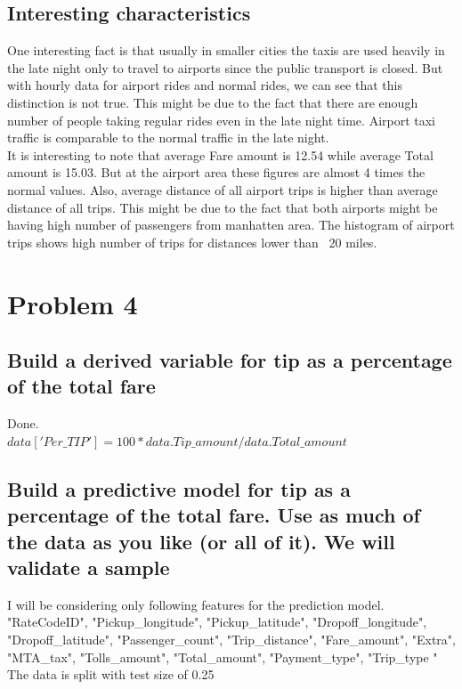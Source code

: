 \documentclass[letterpaper, 11pt]{article}
\begin{document}
\subsection*{Interesting characteristics}
One interesting fact is that usually in smaller cities the taxis are used heavily in the late night only to travel to airports since the public transport is closed. But with hourly data for airport rides and normal rides, we can see that this distinction is not true. This might be due to the fact that there are enough number of people taking regular rides even in the late night time. Airport taxi traffic is comparable to the normal traffic in the late night.\\
It is interesting to note that average Fare amount is 12.54 while average Total amount is 15.03. But at the airport area these figures are almost 4 times the normal values.
Also, average distance of all airport trips is higher than average distance of all trips. This might be due to the fact that both airports might be having high number of passengers from manhatten area. The histogram of airport trips shows high number of trips for distances lower than ~20 miles. 
\newpage
\section*{ Problem 4 }
\subsection*{Build a derived variable for tip as a percentage of the total fare}
Done.\\
$data['Per\_TIP'] = 100*data.Tip\_amount/data.Total\_amount$


\subsection*{Build a predictive model for tip as a percentage of the total fare. Use as much of the data as you like (or
all of it). We will validate a sample}
I will be considering only following features for the prediction model.\\

"RateCodeID",
"Pickup\_longitude",
"Pickup\_latitude",
"Dropoff\_longitude",
"Dropoff\_latitude",
"Passenger\_count",
"Trip\_distance",
"Fare\_amount",
"Extra",
"MTA\_tax",
"Tolls\_amount",
"Total\_amount",
"Payment\_type",
"Trip\_type "\\

The data is split with test size of 0.25\\
\end{document}
